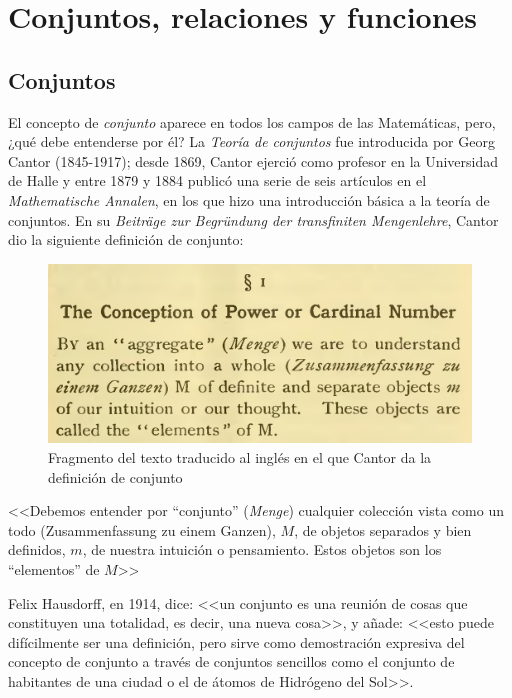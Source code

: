 \chapter{Conjuntos, relaciones y funciones}

\section{Conjuntos}

El concepto de \textit{conjunto} aparece en todos los campos de las Matemáticas,
pero, ¿qué  debe  entenderse  por él? La \textit{Teoría de conjuntos} 
fue introducida por Georg Cantor (1845-1917); desde 1869, Cantor ejerció 
como profesor en la Universidad de Halle y entre 1879 y 1884 publicó una 
serie de seis artículos en el \textit{Mathematische Annalen}, en los 
que hizo una introducción básica a la teoría de conjuntos. En su 
\textit{Beiträge zur Begründung der transfiniten Mengenlehre}, 
Cantor dio la siguiente definición de conjunto:

\begin{figure}[h]
  \centering
  \includegraphics[scale=.2]{fig/definicionConjunto}
  \captionsetup{font=footnotesize}
  \caption{Fragmento del texto traducido al inglés en el que Cantor 
           da la definición de conjunto}
\end{figure}

\begin{center}
    <<Debemos entender por ``conjunto'' (\textit{Menge}) cualquier 
    colección vista como un todo (Zusammenfassung zu einem Ganzen), $M$, 
    de objetos separados y bien definidos, $m$, de nuestra intuición 
    o pensamiento. Estos objetos son los ``elementos'' de $M$>> 
\end{center}

Felix Hausdorff, en 1914, dice: <<un conjunto es una reunión de cosas que 
constituyen una totalidad, es decir, una nueva cosa>>, y añade: 
<<esto puede difícilmente ser una definición, pero sirve como demostración 
expresiva del concepto de conjunto a través de conjuntos sencillos como
el conjunto de habitantes de una ciudad o el de átomos de Hidrógeno del 
Sol>>. 

